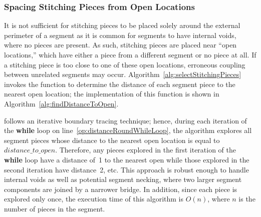 \subsubsection{Spacing Stitching Pieces from Open Locations}\label{sec:determiningSpacingToNearestOpenLocation}

It is not sufficient for stitching pieces to be placed solely around the external perimeter of a segment as it is common for segments to have internal voids, where no pieces are present.  As such, stitching pieces are placed near ``open locations,'' which have either a piece from a different segment or no piece at all. If a stitching piece is too close to one of these open locations, erroneous coupling between unrelated segments may occur.  Algorithm~\ref{alg:selectStitchingPieces} invokes the function  to determine the distance of each segment piece to the nearest open location; the implementation of this function is shown in Algorithm~\ref{alg:findDistanceToOpen}.  

 follows an iterative boundary tracing technique; hence, during each iteration of the \textbf{while} loop on line~\ref{op:distanceRoundWhileLoop}, the algorithm explores all segment pieces whose distance to the nearest open location is equal to $distance\_to\_open$.  Therefore, any pieces explored in the first iteration of the \textbf{while} loop have a distance of~1 to the nearest open while those explored in the second iteration have distance~2, etc. This approach is robust enough to handle internal voids as well as potential segment necking, where two larger segment components are joined by a narrower bridge. In addition, since each piece is explored only once, the execution time of this algorithm is $O(n)$, where $n$ is the number of pieces in the segment.

